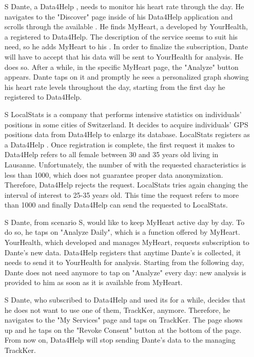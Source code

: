 \documentclass[../../../rasd.tex]{subfiles}
\begin{document}
\begin{itemize}
                    \item[S\subs{3}] Dante, a Data4Help , needs to monitor his heart rate through the day. He navigates to the "Discover" page inside of his Data4Help application and scrolls through the available . He finds MyHeart, a  developed by YourHealth, a  registered to Data4Help. The description of the service seems to suit his need, so he adds MyHeart to his . In order to finalize the subscription, Dante will have to accept that his data will be sent to YourHealth for analysis. He does so. After a while, in the specific MyHeart  page, the "Analyze" button appears. Dante taps on it and promptly he sees a personalized graph showing his heart rate levels throughout the day, starting from the first day he registered to Data4Help.

                    \item[S\subs{4}] LocalStats is a company that performs intensive statistics on individuals' positions in some cities of Switzerland. It decides to acquire individuals' GPS positions data from Data4Help to enlarge its database. LocalStats registers as a Data4Help . Once registration is complete, the first request it makes to Data4Help refers to all female  between 30 and 35 years old living in Lausanne. Unfortunately, the number of  with the requested characteristics is less than 1000, which does not guarantee proper data anonymization. Therefore, Data4Help rejects the  request. LocalStats tries again changing the interval of interest to 25-35 years old. This time the request refers to more than 1000  and finally Data4Help can send the requested  to LocalStats.

                    \item[S\subs{5}] Dante, from scenario S, would like to keep MyHeart active day by day. To do so, he taps on "Analyze Daily", which is a function offered by MyHeart. YourHealth, which developed and manages MyHeart, requests subscription to Dante's new data. Data4Help registers that anytime Dante's  is collected, it needs to send it to YourHealth for analysis. Starting from the following day, Dante does not need anymore to tap on "Analyze" every day: new analysis is provided to him as soon as it is available from MyHeart.

                    \item[S\subs{6}] Dante, who subscribed to Data4Help and used its  for a while, decides that he does not want to use one of them, TrackKer, anymore. Therefore, he navigates to the "My Services" page and taps on TrackKer. The  page shows up and he taps on the "Revoke Consent" button at the bottom of the page. From now on, Data4Help will stop sending Dante's data to the  managing TrackKer.
                \end{itemize}
\end{document}
